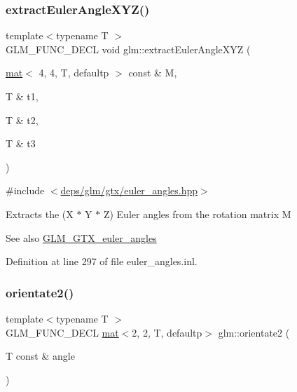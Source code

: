 \subsubsection{\texorpdfstring{extract\+Euler\+Angle\+X\+Y\+Z()}{extractEulerAngleXYZ()}}
{\footnotesize\ttfamily template$<$typename T $>$ \\
G\+L\+M\+\_\+\+F\+U\+N\+C\+\_\+\+D\+E\+CL void glm\+::extract\+Euler\+Angle\+X\+YZ (\begin{DoxyParamCaption}\item[{\hyperlink{structglm_1_1mat}{mat}$<$ 4, 4, T, defaultp $>$ const \&}]{M,  }\item[{T \&}]{t1,  }\item[{T \&}]{t2,  }\item[{T \&}]{t3 }\end{DoxyParamCaption})}



{\ttfamily \#include $<$\hyperlink{euler__angles_8hpp}{deps/glm/gtx/euler\+\_\+angles.\+hpp}$>$}

Extracts the (X $\ast$ Y $\ast$ Z) Euler angles from the rotation matrix M \begin{DoxySeeAlso}{See also}
\hyperlink{group__gtx__euler__angles}{G\+L\+M\+\_\+\+G\+T\+X\+\_\+euler\+\_\+angles} 
\end{DoxySeeAlso}


Definition at line 297 of file euler\+\_\+angles.\+inl.

\mbox{\label{group__gtx__euler__angles_gae16738a9f1887cf4e4db6a124637608d}} 
\subsubsection{\texorpdfstring{orientate2()}{orientate2()}}
{\footnotesize\ttfamily template$<$typename T $>$ \\
G\+L\+M\+\_\+\+F\+U\+N\+C\+\_\+\+D\+E\+CL \hyperlink{structglm_1_1mat}{mat}$<$2, 2, T, defaultp$>$ glm\+::orientate2 (\begin{DoxyParamCaption}\item[{T const \&}]{angle }\end{DoxyParamCaption})}




